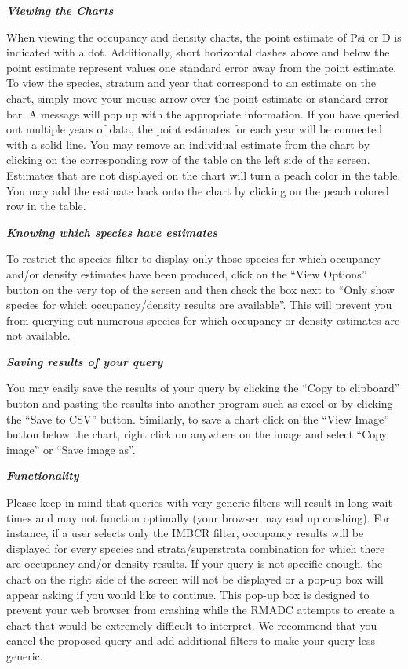 \documentclass[
  letterpaper,
  DIV=11,
  numbers=noendperiod,
  oneside]{scrreprt}
\begin{document}
\textbf{\emph{Viewing the Charts}}

When viewing the occupancy and density charts, the point estimate of Psi
or D is indicated with a dot. Additionally, short horizontal dashes
above and below the point estimate represent values one standard error
away from the point estimate. To view the species, stratum and year that
correspond to an estimate on the chart, simply move your mouse arrow
over the point estimate or standard error bar. A message will pop up
with the appropriate information. If you have queried out multiple years
of data, the point estimates for each year will be connected with a
solid line. You may remove an individual estimate from the chart by
clicking on the corresponding row of the table on the left side of the
screen. Estimates that are not displayed on the chart will turn a peach
color in the table. You may add the estimate back onto the chart by
clicking on the peach colored row in the table.

\textbf{\emph{Knowing which species have estimates}}

To restrict the species filter to display only those species for which
occupancy and/or density estimates have been produced, click on the
``View Options'' button on the very top of the screen and then check the
box next to ``Only show species for which occupancy/density results are
available''. This will prevent you from querying out numerous species
for which occupancy or density estimates are not available.

\textbf{\emph{Saving results of your query}}

You may easily save the results of your query by clicking the ``Copy to
clipboard'' button and pasting the results into another program such as
excel or by clicking the ``Save to CSV'' button. Similarly, to save a
chart click on the ``View Image'' button below the chart, right click on
anywhere on the image and select ``Copy image'' or ``Save image as''.

\textbf{\emph{Functionality}}

Please keep in mind that queries with very generic filters will result
in long wait times and may not function optimally (your browser may end
up crashing). For instance, if a user selects only the IMBCR filter,
occupancy results will be displayed for every species and
strata/superstrata combination for which there are occupancy and/or
density results. If your query is not specific enough, the chart on the
right side of the screen will not be displayed or a pop-up box will
appear asking if you would like to continue. This pop-up box is designed
to prevent your web browser from crashing while the RMADC attempts to
create a chart that would be extremely difficult to interpret. We
recommend that you cancel the proposed query and add additional filters
to make your query less generic.
\end{document}
